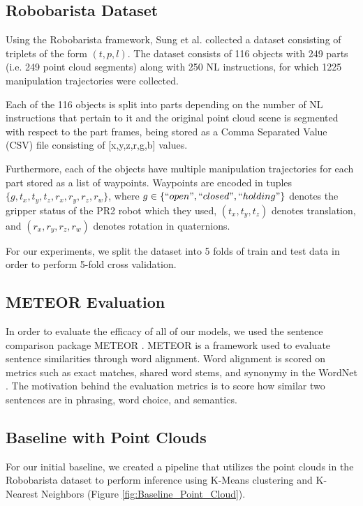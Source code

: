\documentclass[letterpaper, 12 pt, conference]{ieeeconf}
\begin{document}
\subsection{Robobarista Dataset}

Using the Robobarista framework, Sung et al. \cite{sung2016robobarista} collected a dataset consisting of triplets of the form $(t, p, l)$. The dataset consists of 116 objects with 249 parts (i.e. 249 point cloud segments) along with 250 NL instructions, for which 1225 manipulation trajectories were collected. 

Each of the 116 objects is split into parts depending on the number of NL instructions that pertain to it and the original point cloud scene is segmented with respect to the part frames, being stored as a Comma Separated Value (CSV) file consisting of [x,y,z,r,g,b] values. 

Furthermore, each of the objects have multiple manipulation trajectories for each part stored as a list of waypoints. Waypoints are encoded in tuples $\{g, t_x, t_y, t_z, r_x, r_y, r_z, r_w\}$, where $g\in \{``open", ``closed", ``holding"\}$ denotes the gripper status of the PR2 robot which they used, $(t_x, t_y, t_z)$ denotes translation, and $(r_x, r_y, r_z, r_w)$ denotes rotation in quaternions. 

For our experiments, we split the dataset into 5 folds of train and test data in order to perform 5-fold cross validation.

\subsection{METEOR Evaluation}

In order to evaluate the efficacy of all of our models, we used the sentence comparison package METEOR \cite{Denkowski14meteoruniversal}. METEOR is a framework used to evaluate sentence similarities through word alignment. Word alignment is scored on metrics such as exact matches, shared word stems, and synonymy in the WordNet \cite{kilgarriff2000wordnet}. The motivation behind the evaluation metrics is to score how similar two sentences are in phrasing, word choice, and semantics. 

\subsection{Baseline with Point Clouds}\label{baseline_pc}

For our initial baseline, we created a pipeline that utilizes the point clouds in the Robobarista dataset to perform inference using K-Means clustering and K-Nearest Neighbors (Figure \ref{fig:Baseline_Point_Cloud}). 
\end{document}
